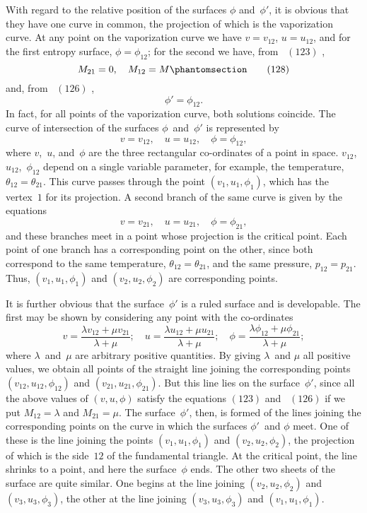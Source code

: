 \documentclass[12pt]{book}[2005/09/16]
\newcommand{\Tag}[1]{%
  \phantomsection\label{eqn:#1}\tag*{\ensuremath{#1}}%
}
\newcommand{\Eq}[1]{%
  \hyperref[eqn:#1]{\ensuremath{#1}}%
}
\newcommand{\PageSep}[1]{\ignorespaces}
\begin{document}
With regard to the relative position of the surfaces $\phi$ and~$\phi'$,
it is obvious that they have one curve in common, the
projection of which is the vaporization curve. At any
point on the vaporization curve we have $v = v_{12}$, $u = u_{12}$, and
for the first entropy surface, $\phi = \phi_{12}$; for the second we have,
from~\Eq{(123)},
\[
M_{21} = 0,\quad
M_{12} = M
\Tag{(128)}
\]
and, from~\Eq{(126)},
\[
\phi' = \phi_{12}.
\]
In fact, for all points of the vaporization curve, both
solutions coincide. The curve of intersection of the
surfaces $\phi$~and~$\phi'$ is represented by
\[
v = v_{12},\quad
u = u_{12},\quad
\phi = \phi_{12},
\]
\PageSep{164}
where $v$,~$u$, and~$\phi$ are the three rectangular co-ordinates of a
point in space. $v_{12}$,~$u_{12}$,~$\phi_{12}$ depend on a single variable
parameter, for example, the temperature, $\theta_{12} = \theta_{21}$. This
curve passes through the point $(v_{1}, u_{1}, \phi_{1})$, which has the
vertex~$1$ for its projection. A second branch of the same
curve is given by the equations
\[
v = v_{21},\quad
u = u_{21},\quad
\phi = \phi_{21},
\]
and these branches meet in a point whose projection is the
critical point. Each point of one branch has a corresponding
point on the other, since both correspond to the same
temperature, $\theta_{12} = \theta_{21}$, and the same pressure, $p_{12} = p_{21}$.
Thus, $(v_{1}, u_{1}, \phi_{1})$ and $(v_{2}, u_{2}, \phi_{2})$ are corresponding points.

It is further obvious that the surface~$\phi'$ is a ruled surface
%
%
and is developable. The first may be shown by considering
any point with the co-ordinates
\[
v = \frac{\lambda v_{12} + \mu v_{21}}{\lambda + \mu};\quad
u = \frac{\lambda u_{12} + \mu u_{21}}{\lambda + \mu};\quad
\phi = \frac{\lambda \phi_{12} + \mu \phi_{21}}{\lambda + \mu};
\]
where $\lambda$~and~$\mu$ are arbitrary positive quantities. By giving
$\lambda$~and $\mu$ all positive values, we obtain all points of the
straight line joining the corresponding points $(v_{12}, u_{12}, \phi_{12})$
and $(v_{21}, u_{21}, \phi_{21})$. But this line lies on the surface~$\phi'$,
since all the above values of $(v, u, \phi)$ satisfy the equations
\Eq{(123)} and~\Eq{(126)} if we put $M_{12} = \lambda$ and $M_{21} = \mu$. The surface~$\phi'$,
then, is formed of the lines joining the corresponding
points on the curve in which the surfaces $\phi'$~and $\phi$ meet.
One of these is the line joining the points $(v_{1}, u_{1}, \phi_{1})$ and
$(v_{2}, u_{2}, \phi_{2})$, the projection of which is the side~$12$ of the
fundamental triangle. At the critical point, the line shrinks
to a point, and here the surface~$\phi$ ends. The other two
sheets of the surface are quite similar. One begins at the
line joining $(v_{2}, u_{2}, \phi_{2})$ and $(v_{3}, u_{3}, \phi_{3})$, the other at the line
joining $(v_{3}, u_{3}, \phi_{3})$ and $(v_{1}, u_{1}, \phi_{1})$.
\end{document}
